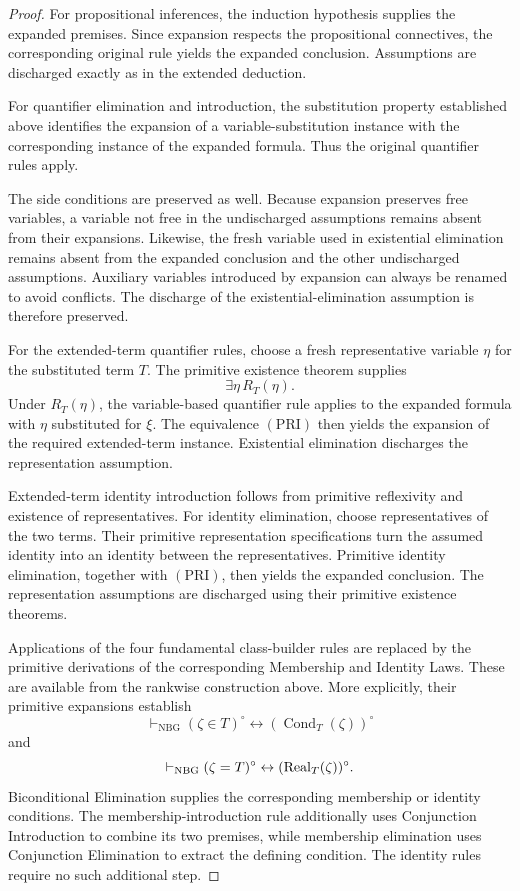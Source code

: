 \begin{proof}
For propositional inferences, the induction
hypothesis supplies the expanded premises.
Since expansion respects the propositional
connectives, the corresponding original rule
yields the expanded conclusion. Assumptions
are discharged exactly as in the extended
deduction.

For quantifier elimination and introduction,
the substitution property established above
identifies the expansion of a variable-substitution
instance with the corresponding instance of the
expanded formula. Thus the original quantifier
rules apply.

The side conditions are preserved as well.
Because expansion preserves free variables,
a variable not free in the undischarged
assumptions remains absent from their expansions.
Likewise, the fresh variable used in existential
elimination remains absent from the expanded
conclusion and the other undischarged assumptions.
Auxiliary variables introduced by expansion
can always be renamed to avoid conflicts.
The discharge of the existential-elimination
assumption is therefore preserved.

For the extended-term quantifier rules, choose
a fresh representative variable \(\eta\) for
the substituted term \(T\). The primitive
existence theorem supplies
\[
\exists\eta\,R_T(\eta).
\]
Under \(R_T(\eta)\), the variable-based quantifier
rule applies to the expanded formula with
\(\eta\) substituted for \(\xi\).
The equivalence \((\mathrm{PRI})\) then yields
the expansion of the required extended-term
instance. Existential elimination discharges
the representation assumption.

Extended-term identity introduction follows
from primitive reflexivity and existence of
representatives. For identity elimination,
choose representatives of the two terms.
Their primitive representation specifications
turn the assumed identity into an identity
between the representatives. Primitive identity
elimination, together with \((\mathrm{PRI})\),
then yields the expanded conclusion. The
representation assumptions are discharged
using their primitive existence theorems.

Applications of the four fundamental
class-builder rules are replaced by the
primitive derivations of the corresponding
Membership and Identity Laws. These are
available from the rankwise construction
above. More explicitly, their primitive
expansions establish
\[
\vdash_{\mathrm{NBG}}
(\zeta\in T)^\circ
\leftrightarrow
(\operatorname{Cond}_T(\zeta))^\circ
\]
and
\[
\vdash_{\mathrm{NBG}}
(\zeta=T)^\circ
\leftrightarrow
(\operatorname{Real}_T(\zeta))^\circ.
\]
Biconditional Elimination supplies the corresponding
membership or identity conditions. The membership-introduction
rule additionally uses Conjunction Introduction to combine its
two premises, while membership elimination uses Conjunction
Elimination to extract the defining condition. The identity
rules require no such additional step.


\end{proof}
